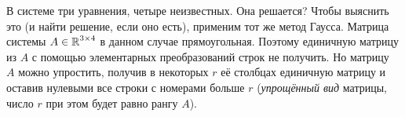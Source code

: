 \documentclass[a4paper,12pt]{article}
\begin{document}
  В системе три уравнения, четыре неизвестных.
  Она решается?
  Чтобы выяснить это (и найти решение, если оно есть), применим тот же метод Гаусса.
  Матрица системы $A \hm\in \RR^{3\times 4}$ в данном случае прямоугольная.
  Поэтому единичную матрицу из $A$ с помощью элементарных преобразований строк не получить.
  Но матрицу~$A$ можно упростить, получив в некоторых $r$ её столбцах единичную матрицу и оставив нулевыми все строки с номерами больше $r$ (\emph{упрощённый вид} матрицы, число $r$ при этом будет равно рангу $A$).
\end{document}
